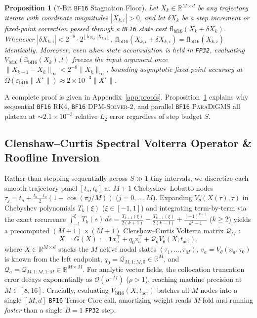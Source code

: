 \documentclass[11pt,a4paper]{article}
\newtheorem{proposition}{Proposition}
\theoremstyle{definition}
\theoremstyle{remark}
\newcommand{\bfsixteen}{\texttt{BF16}}
\newcommand{\fpthirtytwo}{\texttt{FP32}}
\newcommand{\epsbf}{\varepsilon_{\mathrm{bf16}}}
\begin{document}
\begin{proposition}[7-Bit \bfsixteen{} Stagnation Floor]
\label{prop:stagnation}
Let $X_k \in \mathbb{R}^{M \times d}$ be any trajectory iterate with coordinate magnitudes $|X_{k,i}| > 0$, and let $\delta X_k$ be a step increment or fixed-point correction passed through a \bfsixteen{} state cast $\mathrm{fl}_{\mathrm{bf16}}(X_k + \delta X_k)$. Whenever $|\delta X_{k,i}| < 2^{-8} \cdot 2^{\lfloor \log_2 |X_{k,i}| \rfloor}$, $\mathrm{fl}_{\mathrm{bf16}}(X_{k,i} + \delta X_{k,i}) = \mathrm{fl}_{\mathrm{bf16}}(X_{k,i})$ identically. Moreover, even when state accumulation is held in \fpthirtytwo{}, evaluating $V_{\mathrm{bf16}}(\mathrm{fl}_{\mathrm{bf16}}(X_k), t)$ freezes the input argument once $\|X_{k+1} - X_k\|_\infty < 2^{-8}\|X_k\|_\infty$, bounding asymptotic fixed-point accuracy at $\Omega(\epsbf \|X^\star\|) \approx 2 \times 10^{-3}\|X^\star\|$.
\end{proposition}
A complete proof is given in Appendix~\ref{app:proofs}. Proposition~\ref{prop:stagnation} explains why sequential \bfsixteen{} RK4, \bfsixteen{} \textsc{DPM-Solver-2}, and parallel \bfsixteen{} \textsc{ParaDiGMS} all plateau at $\sim 2.1 \times 10^{-3}$ relative $L_2$ error regardless of step budget $S$.

\subsection{Clenshaw--Curtis Spectral Volterra Operator \& Roofline Inversion}
Rather than stepping sequentially across $S \gg 1$ tiny intervals, we discretize each smooth trajectory panel $[t_a, t_b]$ at $M+1$ Chebyshev--Lobatto nodes $\tau_j = t_a + \frac{t_b - t_a}{2}(1 - \cos(\pi j / M))$ ($j=0,\dots,M$). Expanding $V_\theta(X(\tau), \tau)$ in Chebyshev polynomials $T_k(\xi)$ ($\xi \in [-1, 1]$) and integrating term-by-term via the exact recurrence $\int_{-1}^\xi T_k(s)\,ds = \frac{T_{k+1}(\xi)}{2(k+1)} - \frac{T_{k-1}(\xi)}{2(k-1)} + \frac{(-1)^{k+1}}{k^2 - 1}$ ($k \ge 2$) yields a precomputed $(M+1)\times(M+1)$ Clenshaw--Curtis Volterra matrix $\mathcal{Q}_M$ \citep{clenshaw1960method,trefethen2008gauss}:
\begin{equation}
\label{eq:volterra}
    X = G(X) := \mathbf{1} x_a^\top + q_0 v_a^\top + \mathcal{Q}_{a} V_\theta(X, t_{\mathrm{act}}),
\end{equation}
where $X \in \mathbb{R}^{M \times d}$ stacks the $M$ active nodal states $(\tau_1,\dots,\tau_M)$, $v_a = V_\theta(x_a, \tau_0)$ is known from the left endpoint, $q_0 = \mathcal{Q}_{M, 1:M, 0} \in \mathbb{R}^M$, and $\mathcal{Q}_a = \mathcal{Q}_{M, 1:M, 1:M} \in \mathbb{R}^{M \times M}$. For analytic vector fields, the collocation truncation error decays exponentially as $\mathcal{O}(\rho^{-M})$ ($\rho > 1$), reaching machine precision at $M \in [8, 16]$. Crucially, evaluating $V_{\mathrm{bf16}}(X, t_{\mathrm{act}})$ batches all $M$ nodes into a single $[M, d]$ \bfsixteen{} Tensor-Core call, amortizing weight reads $M$-fold and running \emph{faster} than a single $B=1$ \fpthirtytwo{} step.
\end{document}
